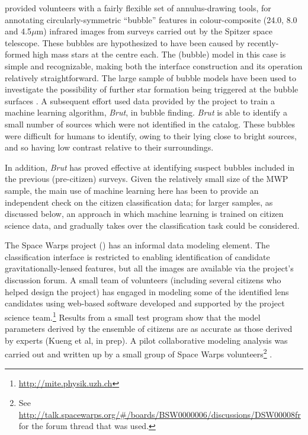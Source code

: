 \documentclass{ar2e}
\begin{document}
\citet{Simpson++2012MWP} provided volunteers with a fairly flexible set of
annulus-drawing tools, for annotating circularly-symmetric ``bubble'' features
in colour-composite (24.0, 8.0 and  4.5$\mu$m) infrared images from surveys
carried out by the Spitzer space telescope. These bubbles are hypothesized  to
have been caused by recently-formed high mass stars at the centre each. The
(bubble) model in this case is simple and recognizable, making both the
interface construction and its operation relatively straightforward. The large
sample of  bubble models have been used to investigate the possibility of
further star formation being triggered at the bubble surfaces
\citep{KendrewEtal2012}. A subsequent effort \citep{Beaumont} used data provided
by the project to train a machine learning algorithm, \emph{Brut}, in bubble
finding. \emph{Brut} is able to identify a small number of sources  which were
not identified in the \citeauthor{Simpson++2012MWP} catalog. These bubbles were
difficult for humans to identify,  owing to their lying close to bright sources,
and so having low contrast relative to their surroundings.

In addition, \emph{Brut} has proved effective at identifying suspect bubbles
included in the previous (pre-citizen) surveys. Given the relatively small size
of the MWP sample, the main use of machine learning here has been to provide an
independent check on the citizen classification data; for larger samples, as
discussed below, an approach in which machine learning is trained on citizen
science data, and gradually takes over the classification task could be
considered. 


The Space Warps project () has an informal data
modeling element. The classification interface is restricted to enabling
identification of candidate gravitationally-lensed features, but all the images
are available via the project's discussion forum. A small team of volunteers
(including several citizens who helped design the project) has engaged in
modeling some of the identified lens candidates using web-based software
developed and supported by the project science
team.\footnote{\url{http://mite.physik.uzh.ch}} Results from a small test
program show that the model parameters derived by the  ensemble of citizens are
as accurate as those derived by experts 
(Kueng et al, in prep).
A pilot collaborative modeling analysis was carried out and written up by a
small group of Space Warps volunteers\footnote{See
\url{http://talk.spacewarps.org/\#/boards/BSW0000006/discussions/DSW00008fr} for
the forum thread that was used.} \citep{Wilcox2014}.
\end{document}
